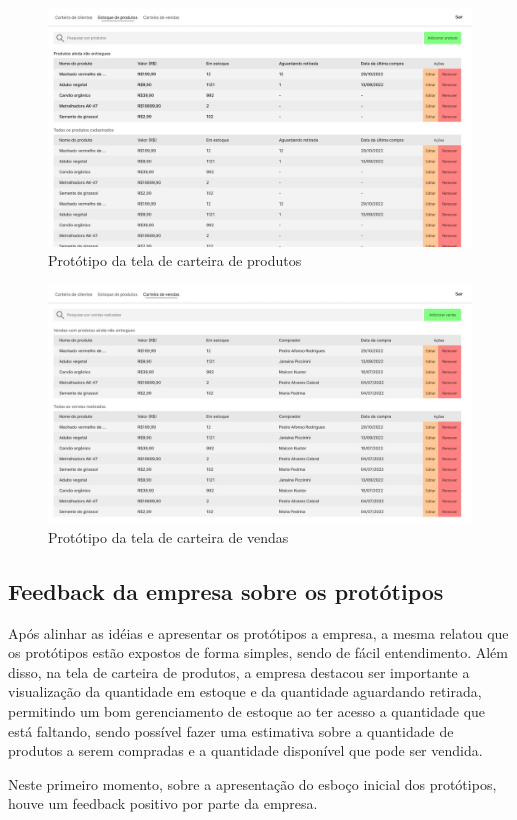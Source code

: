 \documentclass[serif, english, brazilian, oneside]{uffstex}
\begin{document}
\begin{figure}[!htpb]
    \centering
    \caption{Protótipo da tela de carteira de produtos}
    \label{fig:prototipo_carteira_produtos}
    \includegraphics[width=\linewidth]{imagens/prototipo_estoque_produtos.jpeg}
\end{figure}

\begin{figure}[!htpb]
    \centering
    \caption{Protótipo da tela de carteira de vendas}
    \label{fig:prototipo_carteira_vendas}
    \includegraphics[width=\linewidth]{imagens/prototipo_carteira_vendas.jpeg}
\end{figure}

\newpage

\subsection{Feedback da empresa sobre os protótipos}

Após alinhar as idéias e apresentar os protótipos a empresa, a mesma relatou que os protótipos estão expostos de forma simples, sendo de fácil entendimento. Além disso, na tela de carteira de produtos, a empresa destacou ser importante a visualização da quantidade em estoque e da quantidade aguardando retirada, permitindo um bom gerenciamento de estoque ao ter acesso a quantidade que está faltando, sendo possível fazer uma estimativa sobre a quantidade de produtos a serem compradas e a quantidade disponível que pode ser vendida.

Neste primeiro momento, sobre a apresentação do esboço inicial dos protótipos, houve um feedback positivo por parte da empresa.

\printbibliography[heading=abnt]
\end{document}
